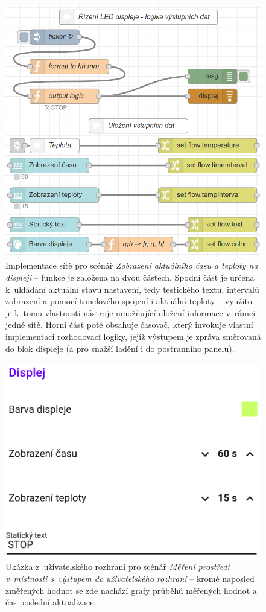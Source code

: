 \begin{figure}
    \centering
    \includegraphics[width=.7\textwidth]{figures/fis-flow-2.png}
    \caption{Implementace sítě pro scénář \textit{Zobrazení aktuálního času a teploty na displeji} -- funkce je
    založena na dvou částech.
    Spodní část je určena k~ukládání aktuální stavu nastavení, tedy testického textu, intervalů zobrazení a pomocí
    tunelového spojení i aktuální teploty -- využito je k~tomu vlastnosti nástroje umožňující uložení informace
    v~rámci jedné sítě.
    Horní část poté obsahuje časovač, který invokuje vlastní implementaci rozhodovací logiky, jejíž výstupem je
    zpráva směrovaná do blok displeje (a pro snažší ladění i do postranního panelu).}
    \label{fig:node-red-production-2}
\end{figure}
\begin{figure}
    \centering
    \includegraphics[width=.5\textwidth]{figures/fis-flow-2-ui.png}
    \caption{Ukázka z~uživatelského rozhraní pro scénář \textit{Měření prostředí v~místnosti s~výstupem do
    uživatelského rozhraní} -- kromě naposled změřených hodnot se zde nachází grafy průběhů měřených hodnot a čas
    poslední aktualizace.}
    \label{fig:node-red-production-2-ui}
\end{figure}


